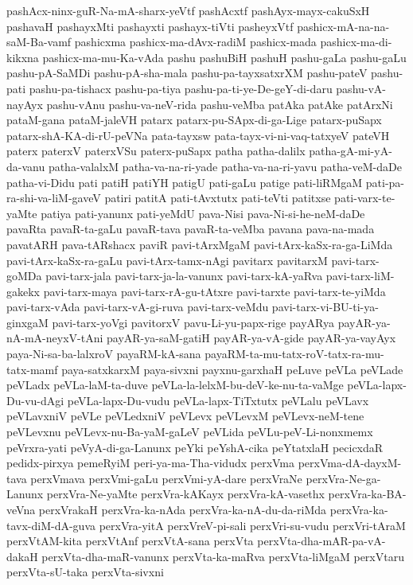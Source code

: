 {pashAcx-ninx-guR-Na-mA-sharx-yeVtf
pashAcxtf
pashAyx-mayx-cakuSxH
pashavaH
pashayxMti
pashayxti
pashayx-tiVti
pasheyxVtf
pashicx-mA-na-na-saM-Ba-vamf
pashicxma
pashicx-ma-dAvx-radiM
pashicx-mada
pashicx-ma-di-kikxna
pashicx-ma-mu-Ka-vAda
pashu
pashuBiH
pashuH
pashu-gaLa
pashu-gaLu
pashu-pA-SaMDi
pashu-pA-sha-mala
pashu-pa-tayxsatxrXM
pashu-pateV
pashu-pati
pashu-pa-tishacx
pashu-pa-tiya
pashu-pa-ti-ye-De-geY-di-daru
pashu-vA-nayAyx
pashu-vAnu
pashu-va-neV-rida
pashu-veMba
patAka
patAke
patArxNi
pataM-gana
pataM-jaleVH
patarx
patarx-pu-SApx-di-ga-Lige
patarx-puSapx
patarx-shA-KA-di-rU-peVNa
pata-tayxsw
pata-tayx-vi-ni-vaq-tatxyeV
pateVH
paterx
paterxV
paterxVSu
paterx-puSapx
patha
patha-dalilx
patha-gA-mi-yA-da-vanu
patha-valalxM
patha-va-na-ri-yade
patha-va-na-ri-yavu
patha-veM-daDe
patha-vi-Didu
pati
patiH
patiYH
patigU
pati-gaLu
patige
pati-liRMgaM
pati-pa-ra-shi-va-liM-gaveV
patiri
patitA
pati-tAvxtutx
pati-teVti
patitxse
pati-varx-te-yaMte
patiya
pati-yanunx
pati-yeMdU
pava-Nisi
pava-Ni-si-he-neM-daDe
pavaRta
pavaR-ta-gaLu
pavaR-tava
pavaR-ta-veMba
pavana
pava-na-mada
pavatARH
pava-tARshacx
paviR
pavi-tArxMgaM
pavi-tArx-kaSx-ra-ga-LiMda
pavi-tArx-kaSx-ra-gaLu
pavi-tArx-tamx-nAgi
pavitarx
pavitarxM
pavi-tarx-goMDa
pavi-tarx-jala
pavi-tarx-ja-la-vanunx
pavi-tarx-kA-yaRva
pavi-tarx-liM-gakekx
pavi-tarx-maya
pavi-tarx-rA-gu-tAtxre
pavi-tarxte
pavi-tarx-te-yiMda
pavi-tarx-vAda
pavi-tarx-vA-gi-ruva
pavi-tarx-veMdu
pavi-tarx-vi-BU-ti-ya-ginxgaM
pavi-tarx-yoVgi
pavitorxV
pavu-Li-yu-papx-rige
payARya
payAR-ya-nA-mA-neyxV-tAni
payAR-ya-saM-gatiH
payAR-ya-vA-gide
payAR-ya-vayAyx
paya-Ni-sa-ba-lalxroV
payaRM-kA-sana
payaRM-ta-mu-tatx-roV-tatx-ra-mu-tatx-mamf
paya-satxkarxM
paya-sivxni
payxnu-garxhaH
peLuve
peVLa
peVLade
peVLadx
peVLa-laM-ta-duve
peVLa-la-lelxM-bu-deV-ke-nu-ta-vaMge
peVLa-lapx-Du-vu-dAgi
peVLa-lapx-Du-vudu
peVLa-lapx-TiTxtutx
peVLalu
peVLavx
peVLavxniV
peVLe
peVLedxniV
peVLevx
peVLevxM
peVLevx-neM-tene
peVLevxnu
peVLevx-nu-Ba-yaM-gaLeV
peVLida
peVLu-peV-Li-nonxmemx
peVrxra-yati
peVyA-di-ga-Lanunx
peYki
peYshA-cika
peYtatxlaH
pecicxdaR
pedidx-pirxya
pemeRyiM
peri-ya-ma-Tha-vidudx
perxVma
perxVma-dA-dayxM-tava
perxVmava
perxVmi-gaLu
perxVmi-yA-dare
perxVraNe
perxVra-Ne-ga-Lanunx
perxVra-Ne-yaMte
perxVra-kAKayx
perxVra-kA-vasethx
perxVra-ka-BA-veVna
perxVrakaH
perxVra-ka-nAda
perxVra-ka-nA-du-da-riMda
perxVra-ka-tavx-diM-dA-guva
perxVra-yitA
perxVreV-pi-sali
perxVri-su-vudu
perxVri-tAraM
perxVtAM-kita
perxVtAnf
perxVtA-sana
perxVta
perxVta-dha-mAR-pa-vA-dakaH
perxVta-dha-maR-vanunx
perxVta-ka-maRva
perxVta-liMgaM
perxVtaru
perxVta-sU-taka
perxVta-sivxni
}

